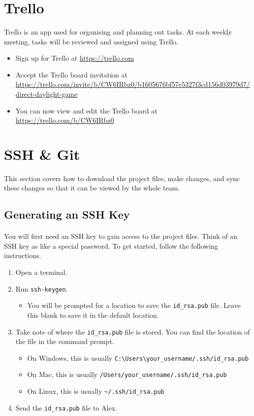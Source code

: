 \documentclass[11pt]{article}
\begin{document}
\section{Trello}
\paragraph{}
Trello is an app used for organising and planning out tasks. At each weekly meeting, tasks will be reviewed and assigned using Trello.
\begin{itemize}
\item Sign up for Trello at \url{https://trello.com}
\item Accept the Trello board invitation at \\ \url{https://trello.com/invite/b/CW6IRbz0/b1605676bf57e5327f3cd156d03979d7/direct-daylight-game}
\item You can now view and edit the Trello board at \url{https://trello.com/b/CW6IRbz0}
\end{itemize}
\section{SSH \& Git}
\paragraph{}
This section covers how to download the project files, make changes, and sync these changes so that it can be viewed by the whole team.
\subsection{Generating an SSH Key}
\paragraph{}
You will first need an SSH key to gain access to the project files. Think of an SSH key as like a special password. To get started, follow the following instructions.
\begin{enumerate}
\item Open a terminal.
\item Run \lstinline{ssh-keygen}.
\begin{itemize}
\item You will be prompted for a location to save the \lstinline{id_rsa.pub} file. Leave this blank to save it in the default location.
\end{itemize}
\item Take note of where the \lstinline{id_rsa.pub} file is stored. You can find the location of the file in the command prompt.
\begin{itemize}
\item On Windows, this is usually \lstinline{C:\Users\your_username/.ssh/id_rsa.pub}
\item On Mac, this is usually \lstinline{/Users/your_username/.ssh/id_rsa.pub}
\item On Linux, this is usually \lstinline{~/.ssh/id_rsa.pub}
\end{itemize}
\item Send the \lstinline{id_rsa.pub} file to Alex.
\end{enumerate}
\end{document}
